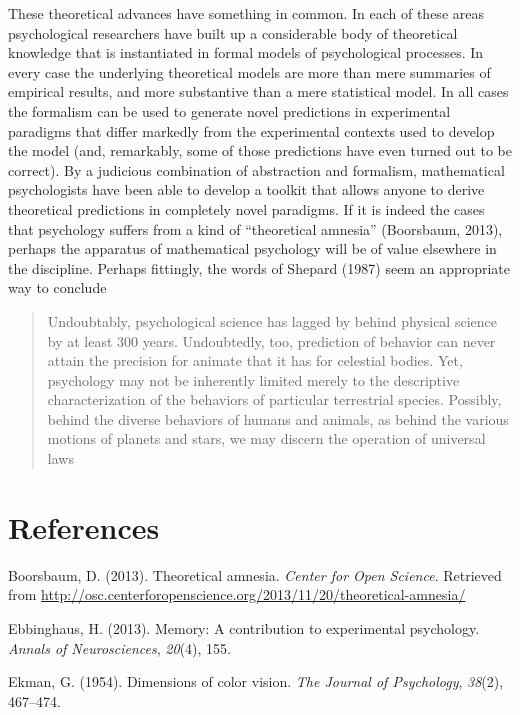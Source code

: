 \documentclass[english,doc]{apa6}
\begin{document}
These theoretical advances have something in common. In each of these areas psychological researchers have built up a considerable body of theoretical knowledge that is instantiated in formal models of psychological processes. In every case the underlying theoretical models are more than mere summaries of empirical results, and more substantive than a mere statistical model. In all cases the formalism can be used to generate novel predictions in experimental paradigms that differ markedly from the experimental contexts used to develop the model (and, remarkably, some of those predictions have even turned out to be correct). By a judicious combination of abstraction and formalism, mathematical psychologists have been able to develop a toolkit that allows anyone to derive theoretical predictions in completely novel paradigms. If it is indeed the cases that psychology suffers from a kind of ``theoretical amnesia'' (Boorsbaum, 2013), perhaps the apparatus of mathematical psychology will be of value elsewhere in the discipline. Perhaps fittingly, the words of Shepard (1987) seem an appropriate way to conclude

\begin{quote}
Undoubtably, psychological science has lagged by behind physical science by at least 300 years. Undoubtedly, too, prediction of behavior can never attain the precision for animate that it has for celestial bodies. Yet, psychology may not be inherently limited merely to the descriptive characterization of the behaviors of particular terrestrial species. Possibly, behind the diverse behaviors of humans and animals, as behind the various motions of planets and stars, we may discern the operation of universal laws
\end{quote}

\hypertarget{references}{%
\section{References}\label{references}}

\hypertarget{refs}{}
\leavevmode\hypertarget{ref-boorsbaum2013theoretical}{}%
Boorsbaum, D. (2013). Theoretical amnesia. \emph{Center for Open Science}. Retrieved from \url{http://osc.centerforopenscience.org/2013/11/20/theoretical-amnesia/}

\leavevmode\hypertarget{ref-ebbinghaus2013memory}{}%
Ebbinghaus, H. (2013). Memory: A contribution to experimental psychology. \emph{Annals of Neurosciences}, \emph{20}(4), 155.

\leavevmode\hypertarget{ref-ekman1954dimensions}{}%
Ekman, G. (1954). Dimensions of color vision. \emph{The Journal of Psychology}, \emph{38}(2), 467--474.
\end{document}

